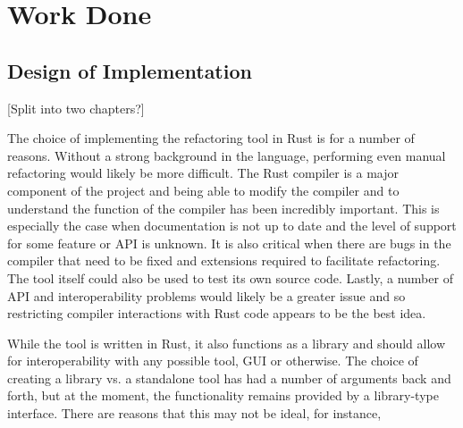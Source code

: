 \chapter{Work Done}\label{C:wd}

\section{Design of Implementation}


[Split into two chapters?]

The choice of implementing the refactoring tool in Rust is for a number of reasons. Without a strong background in the language, performing even manual refactoring would likely be more difficult. The Rust compiler is a major component of the project and being able to modify the compiler and to understand the function of the compiler has been incredibly important. This is especially the case when documentation is not up to date and the level of support for some feature or API is unknown. It is also critical when there are bugs in the compiler that need to be fixed and extensions required to facilitate refactoring. The tool itself could also be used to test its own source code. Lastly, a number of API and interoperability problems would likely be a greater issue and so restricting compiler interactions with Rust code appears to be the best idea. 

While the tool is written in Rust, it also functions as a library and should allow for interoperability with any possible tool, GUI or otherwise. The choice of creating a library vs. a standalone tool has had a number of arguments back and forth, but at the moment, the functionality remains provided by a library-type interface. There are reasons that this may not be ideal, for instance, 




